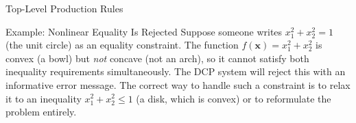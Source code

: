 \documentclass[aspectratio=169,10pt]{beamer}
\begin{document}
\begin{frame}[allowframebreaks]{Top-Level Production Rules}
  \begin{exampleblock}{Example: Nonlinear Equality Is Rejected}
    Suppose someone writes $x_1^2 + x_2^2 = 1$ (the unit circle) as an
    equality constraint.  The function $f(\mathbf{x}) = x_1^2 + x_2^2$
    is convex (a bowl) but \emph{not} concave (not an arch), so it
    cannot satisfy both inequality requirements simultaneously.  The DCP
    system will reject this with an informative error message.  The
    correct way to handle such a constraint is to relax it to an
    inequality $x_1^2 + x_2^2 \leq 1$ (a disk, which is convex) or to
    reformulate the problem entirely.
  \end{exampleblock}

\end{frame}

\end{document}
